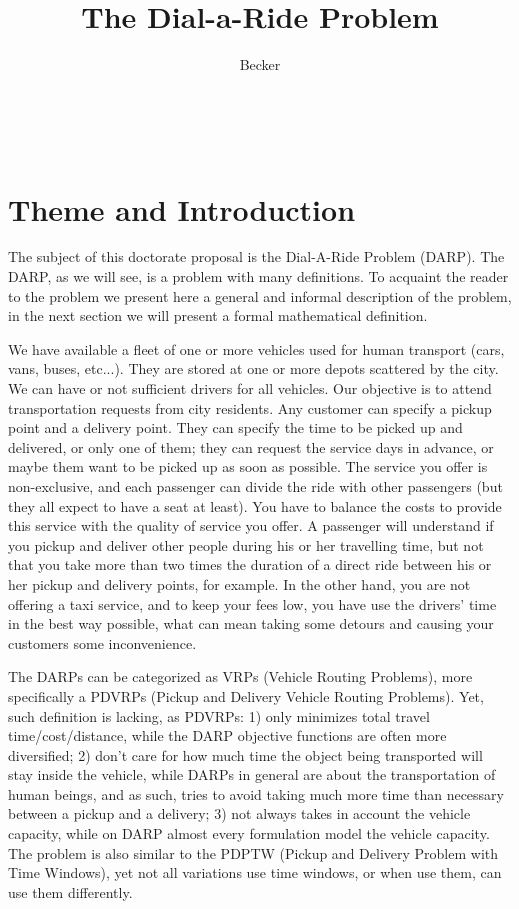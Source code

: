 \documentclass[english,plano-doutorado,twoside]{iiufrgs}
\title{The Dial-a-Ride Problem}
\author{Becker}{Henrique}
\begin{document}
\maketitle

\setlength{\parskip}{1.5ex}

\renewcommand{\thechapter}{}
\renewcommand{\thesection}{\arabic{section}}

~
\newpage
\thispagestyle{empty}

\section{Theme and Introduction}

The subject of this doctorate proposal is the Dial-A-Ride Problem (DARP). The DARP, as we will see, is a problem with many definitions. To acquaint the reader to the problem we present here a general and informal description of the problem, in the next section we will present a formal mathematical definition.

We have available a fleet of one or more vehicles used for human transport (cars, vans, buses, etc...). They are stored at one or more depots scattered by the city. We can have or not sufficient drivers for all vehicles. Our objective is to attend transportation requests from city residents. Any customer can specify a pickup point and a delivery point. They can specify the time to be picked up and delivered, or only one of them; they can request the service days in advance, or maybe them want to be picked up as soon as possible. The service you offer is non-exclusive, and each passenger can divide the ride with other passengers (but they all expect to have a seat at least). You have to balance the costs to provide this service with the quality of service you offer. A passenger will understand if you pickup and deliver other people during his or her travelling time, but not that you take more than two times the duration of a direct ride between his or her pickup and delivery points, for example. In the other hand, you are not offering a taxi service, and to keep your fees low, you have use the drivers' time in the best way possible, what can mean taking some detours and causing your customers some inconvenience.

The DARPs can be categorized as VRPs (Vehicle Routing Problems), more specifically a PDVRPs (Pickup and Delivery Vehicle Routing Problems). Yet, such definition is lacking, as PDVRPs: 1) only minimizes total travel time/cost/distance, while the DARP objective functions are often more diversified; 2) don't care for how much time the object being transported will stay inside the vehicle, while DARPs in general are about the transportation of human beings, and as such, tries to avoid taking much more time than necessary between a pickup and a delivery; 3) not always takes in account the vehicle capacity, while on DARP almost every formulation model the vehicle capacity. The problem is also similar to the PDPTW (Pickup and Delivery Problem with Time Windows), yet not all variations use time windows, or when use them, can use them differently.
\end{document}
